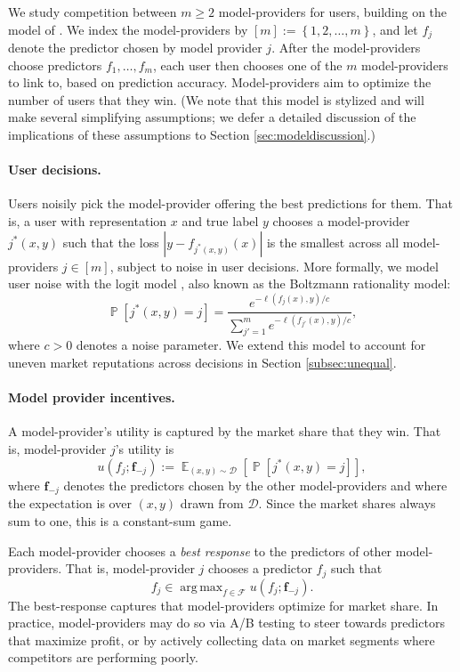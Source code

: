\documentclass[letterpaper,11pt]{article}
\theoremstyle{plain}
\DeclareMathOperator*{\argmax}{arg\,max}
\DeclareMathOperator*{\E}{\mathbb{E}}
\DeclareMathOperator*{\Prob}{\mathbb{P}}
\begin{document}
We study competition between $m \ge 2$ model-providers for users, building on the model of \citet{BT17, BT19}. We index the model-providers by $[m] := \left\{1, 2, \ldots, m\right\}$, and let $f_j$ denote the predictor chosen by model provider $j$. After the model-providers choose predictors $f_1, \ldots, f_m$, each user then chooses one of the $m$ model-providers to link to, based on prediction accuracy. Model-providers aim to optimize the number of users that they win. (We note that this model is stylized and will make several simplifying assumptions; we defer a detailed discussion of the implications of these assumptions to Section \ref{sec:modeldiscussion}.) 


\paragraph{User decisions.} Users noisily pick the model-provider offering the best predictions for them. That is, a user with representation $x$ and true label $y$ chooses a model-provider $j^*(x,y)$ such that the loss $|y - f_{j^*(x,y)}(x)|$ is the smallest across all model-providers $j \in [m]$, subject to noise in user decisions. More formally, we model user noise with the logit model \citep{train2002discrete}, also known as the Boltzmann rationality model:
\begin{equation}
\label{eq:userchoice}
\Prob[j^*(x,y) = j] = \frac{e^{- \ell(f_j(x), y) / c}}{\sum_{j'=1}^m e^{- \ell(f_{j'}(x), y) / c}}, 
\end{equation}
where $c > 0$ denotes a noise parameter. We extend this model to account for uneven market reputations across decisions in Section \ref{subsec:unequal}.


\paragraph{Model provider incentives.} A model-provider's utility is captured by the market share that they win. That is, model-provider $j$'s utility is 
\[u(f_j; \mathbf{f}_{-j}) := \E_{(x,y) \sim \mathcal{D}} \left[\Prob[j^*(x,y) = j] \right],\]
where $\textbf{f}_{-j}$ denotes the predictors chosen by the other model-providers and where the expectation is over $(x,y)$ drawn from $\mathcal{D}$. Since the market shares always sum to one, this is a constant-sum game. 


Each model-provider chooses a \textit{best response} to the predictors of other model-providers. That is, model-provider $j$ chooses a predictor $f_j$ such that 
\[f_j \in \argmax_{f\in \mathcal{F}} u(f_j; \mathbf{f}_{-j}). \] The best-response captures that model-providers optimize for market share. In practice, model-providers may do so via {A/B testing} to steer towards predictors that maximize profit, or by {actively collecting data} on market segments where competitors are performing poorly.
\end{document}
